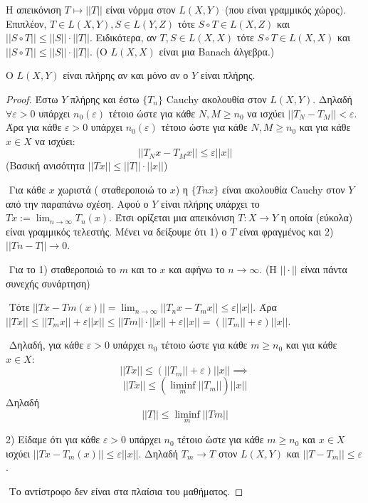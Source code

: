 \begin{protash}
    Η απεικόνιση $T \mapsto ||T||$ είναι νόρμα στον $L(X,Y)$ (που είναι γραμμικός χώρος). Επιπλέον, $T \in L(X,Y), S \in L(Y,Z)$ τότε $S\circ T \in L(X,Z)$ και $|| S\circ T ||\leq ||S|| \cdot ||T||$. Ειδικότερα, αν $T,S \in L(X,X)$ τότε $S\circ T \in L(X,X)$ και $||S\circ T|| \leq ||S|| \cdot ||T||$. (Ο $L(X,X)$ είναι μια {\eng Banach} άλγεβρα.)

\end{protash}

\begin{theorem}Ο $L(X,Y)$ είναι πλήρης αν και μόνο αν ο $Y$ είναι πλήρης.
\end{theorem}

\begin{proof} Έστω $Y$ πλήρης και έστω $\{T_n\}$ {\eng Cauchy} ακολουθία στον $L(X,Y)$. Δηλαδή $\forall \varepsilon >0$ υπάρχει $n_0 (\varepsilon)$ τέτοιο ώστε για κάθε $N,M \geq n_0$ να ισχύει $||T_N - T_M|| < \varepsilon$. Άρα για κάθε $\varepsilon >0$ υπάρχει $n_0(\varepsilon)$ τέτοιο ώστε για κάθε $N,M\geq n_0$ και για κάθε $x \in X$ να ισχύει:
    $$||T_N x - T_M x || \leq \varepsilon ||x||$$ (Βασική ανισότητα $||Tx|| \leq ||T|| \cdot ||x||$)

    $ $\newline
    Για κάθε $x$ χωριστά ( σταθεροποιώ το $x$) η $\{Tn x\}$ είναι ακολουθία {\eng Cauchy} στον $Y$ από την παραπάνω σχέση. Αφού ο $Y$ είναι πλήρης υπάρχει το $Tx := \lim_{n\rightarrow \infty} T_n (x)$. Έτσι ορίζεται μια απεικόνιση $T:X \rightarrow Y$ η οποία (εύκολα) είναι γραμμικός τελεστής. Μένει να δείξουμε ότι 1) ο $T$ είναι φραγμένος και 2) $||Tn-T||\rightarrow 0$.

    $ $\newline
    Για το 1) σταθεροποιώ το $m$ και το $x$ και αφήνω το $n\rightarrow \infty$. (Η $||\cdot ||$ είναι πάντα συνεχής συνάρτηση)

    $ $\newline
    Τότε $||Tx - Tm(x)|| = \lim_{n\rightarrow \infty}||T_n x - T_m x|| \leq \varepsilon ||x||$. Άρα $||Tx|| \leq ||T_m x|| + \varepsilon ||x|| \leq ||Tm||\cdot ||x|| + \varepsilon ||x|| = (||T_m|| + \varepsilon) ||x||$.

    $ $\newline
    Δηλαδή, για κάθε $\varepsilon >0$ υπάρχει $n_0$ τέτοιο ώστε για κάθε $m\geq n_0$ και για κάθε $x \in X$:
    $$||Tx|| \leq \left( ||T_m|| + \varepsilon\right)||x|| \implies$$
    $$||Tx|| \leq (\liminf_m ||T_m||) ||x||$$ Δηλαδή
    $$||T|| \leq \liminf_m ||Tm||$$


    2) Είδαμε ότι για κάθε $\varepsilon >0$ υπάρχει $n_0$ τέτοιο ώστε για κάθε $m\geq n_0$ και $x \in X$ ισχύει $||Tx-T_m(x) || \leq \varepsilon ||x||$. Δηλαδή $T_m \rightarrow T$ στον $L(X,Y)$ και $||T-T_m|| \leq \varepsilon$.

    $ $\newline
    Το αντίστροφο δεν είναι στα πλαίσια του μαθήματος. %
\end{proof}

